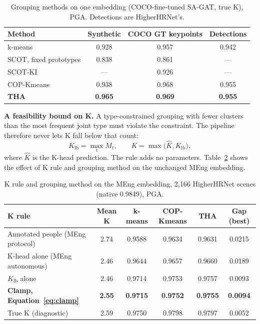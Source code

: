 \documentclass[11pt,a4paper]{article}
\newcommand{\Klb}{K_{\mathrm{lb}}}
\begin{document}
\begin{table}[H]
\centering
\caption{Grouping methods on one embedding (COCO-fine-tuned SA-GAT, true K), PGA. Detections are HigherHRNet's.}
\label{tab:methods}
\begin{tabular}{lccc}
\toprule
Method & Synthetic & COCO GT keypoints & Detections \\
\midrule
k-means & 0.928 & 0.957 & 0.942 \\
SCOT, fixed prototypes & 0.838 & 0.861 & --- \\
SCOT-KI & --- & 0.926 & --- \\
COP-Kmeans & 0.938 & 0.968 & 0.955 \\
\textbf{THA} & \textbf{0.965} & \textbf{0.969} & \textbf{0.955} \\
\bottomrule
\end{tabular}
\end{table}

\textbf{A feasibility bound on K.}
A type-constrained grouping with fewer clusters than the most frequent joint type must violate the constraint.
The pipeline therefore never lets K fall below that count:
\begin{equation}
    \Klb = \max_t M_t , \qquad K = \max\bigl(\hat{K}, \Klb\bigr) ,
    \label{eq:clamp}
\end{equation}
where $\hat{K}$ is the K-head prediction.
The rule adds no parameters.
Table~\ref{tab:krule} shows the effect of K rule and grouping method on the unchanged MEng embedding.

\begin{table}[H]
\centering
\caption{K rule and grouping method on the MEng embedding, 2,166 HigherHRNet scenes (native 0.9849), PGA.}
\label{tab:krule}
\begin{tabular}{lccccc}
\toprule
K rule & Mean K & k-means & COP-Kmeans & THA & Gap (best) \\
\midrule
Annotated people (MEng protocol) & 2.74 & 0.9588 & 0.9634 & 0.9631 & 0.0215 \\
K-head alone (MEng autonomous) & 2.46 & 0.9644 & 0.9657 & 0.9660 & 0.0189 \\
$\Klb$ alone & 2.46 & 0.9714 & 0.9753 & 0.9757 & 0.0093 \\
\textbf{Clamp, Equation~\eqref{eq:clamp}} & \textbf{2.55} & \textbf{0.9715} & \textbf{0.9752} & \textbf{0.9755} & \textbf{0.0094} \\
True K (diagnostic) & 2.59 & 0.9750 & 0.9798 & 0.9797 & 0.0052 \\
\bottomrule
\end{tabular}
\end{table}
\end{document}
